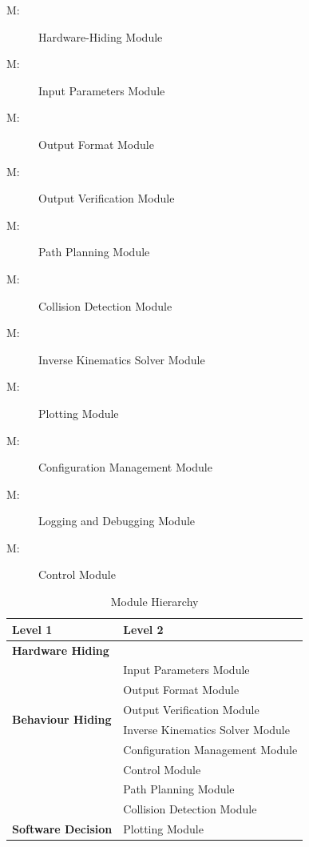\documentclass[12pt, titlepage]{article}
\newcounter{mnum}
\newcommand{\mthemnum}{M\themnum}
\begin{document}
\begin{description}
\item [ \mthemnum \label{mHH1}:] Hardware-Hiding Module
\item [ \mthemnum \label{mHH2}:] Input Parameters Module
\item [ \mthemnum \label{mHH3}:] Output Format Module
\item [ \mthemnum \label{mHH4}:] Output Verification Module
\item [ \mthemnum \label{mHH5}:] Path Planning Module
\item [ \mthemnum \label{mHH6}:] Collision Detection Module
\item [ \mthemnum \label{mHH7}:] Inverse Kinematics Solver Module
\item [ \mthemnum \label{mHH8}:] Plotting Module
\item [ \mthemnum \label{mHH9}:] Configuration Management Module
\item [ \mthemnum \label{mHH10}:] Logging and Debugging Module
\item [ \mthemnum \label{mHH11}:] Control Module
\end{description}


\begin{table}[h!]
  \centering
  \begin{tabular}{p{} p{}}
  \toprule
  \textbf{Level 1} & \textbf{Level 2}\\
  \midrule
  \textbf{Hardware Hiding} & \\ 
  \midrule
  \multirow{6}{0.3\textwidth}{\textbf{Behaviour Hiding}} 
  & Input Parameters Module \\ 
  & Output Format Module \\ 
  & Output Verification Module \\ 
  & Inverse Kinematics Solver Module \\ 
  & Configuration Management Module \\ 
  & Control Module\\
  & Path Planning Module \\ 
  & Collision Detection Module \\ 
  \midrule
  \multirow{1}{0.3\textwidth}{\textbf{Software Decision}} 
  & Plotting Module \\ 
  \bottomrule
  \end{tabular}
  \caption{Module Hierarchy}
  \label{TblMH}
\end{table}
  
\end{document}
